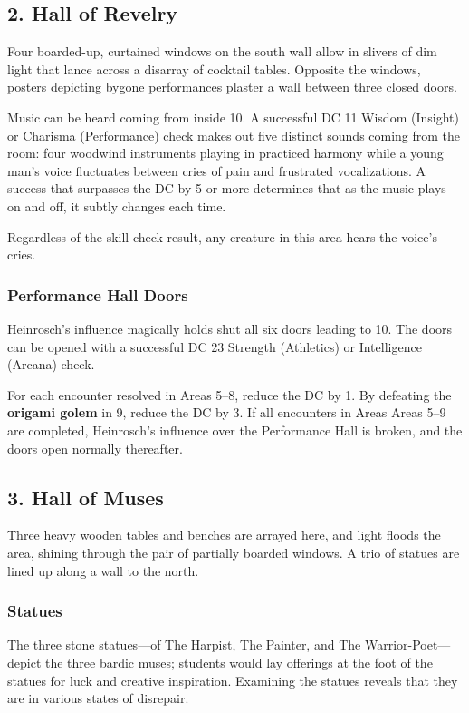 \documentclass[10pt,a4paper,twoside,bg=print,twocolumn,openany,nodeprecatedcode]{dndbook}
\begin{document}
\subsection{2. Hall of Revelry}
\begin{DndReadAloud}{}
Four boarded-up, curtained windows on the south wall allow in slivers of dim light that lance across a disarray of cocktail tables. Opposite the windows, posters depicting bygone performances plaster a wall between three closed doors.

\end{DndReadAloud}

Music can be heard coming from inside 10. A successful DC 11 Wisdom (Insight) or Charisma (Performance) check makes out five distinct sounds coming from the room: four woodwind instruments playing in practiced harmony while a young man's voice fluctuates between cries of pain and frustrated vocalizations. A success that surpasses the DC by 5 or more determines that as the music plays on and off, it subtly changes each time.

Regardless of the skill check result, any creature in this area hears the voice's cries.

\subsubsection{Performance Hall Doors}
Heinrosch's influence magically holds shut all six doors leading to 10. The doors can be opened with a successful DC 23 Strength (Athletics) or Intelligence (Arcana) check.

For each encounter resolved in Areas 5–8, reduce the DC by 1. By defeating the \textbf{origami golem} in 9, reduce the DC by 3. If all encounters in Areas Areas 5–9 are completed, Heinrosch's influence over the Performance Hall is broken, and the doors open normally thereafter.

\subsection{3. Hall of Muses}
\begin{DndReadAloud}{}
Three heavy wooden tables and benches are arrayed here, and light floods the area, shining through the pair of partially boarded windows. A trio of statues are lined up along a wall to the north.

\end{DndReadAloud}

\subsubsection{Statues}
The three stone statues—of The Harpist, The Painter, and The Warrior-Poet—depict the three bardic muses; students would lay offerings at the foot of the statues for luck and creative inspiration. Examining the statues reveals that they are in various states of disrepair.
\end{document}
